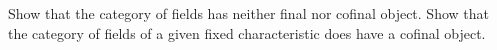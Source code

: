 %
%
%
%
%
%

\begin{exercise}Show that the category of fields has neither final nor cofinal object. Show that the category of fields of a given fixed characteristic does have a cofinal object.
\end{exercise}

%


